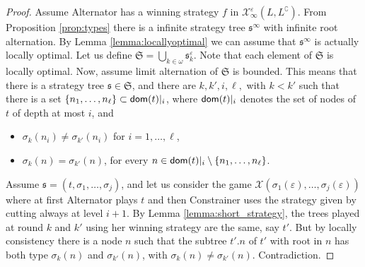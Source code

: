 \begin{proof}
Assume Alternator has a winning strategy $f$ in  $\mathcal{X}^\varepsilon_\infty(L, L^\complement)$. From Proposition \ref{prop:types} there is a infinite strategy tree $\mathfrak{s}^\infty$ with infinite root alternation. 
 By Lemma \ref{lemma:locallyoptimal} we can assume that $\mathfrak{s}^\infty$ is actually locally optimal. Let us define $\mathfrak{S}=\bigcup_{k \in \omega} \mathfrak{s}^\varepsilon_k$. Note that each element of $\mathfrak{S}$ is locally optimal.
Now, assume limit alternation of $\mathfrak{S}$ is bounded.
This means that there is a strategy tree $\mathfrak{s} \in \mathfrak{S}$, and there are $k, k', i, \ell, $ with $k < k'$ such that
 there is a set $\{n_1, \dots, n_\ell\} \subset \mathsf{dom}(t)|_i$, where $\mathsf{dom}(t)|_i$ denotes the set of nodes of $t$ of depth at most $i$, and
\begin{itemize}
\item $\sigma_k(n_i)\neq \sigma_{k'}(n_i)$ for $i=1, \dots, \ell$,
\item $\sigma_k(n)= \sigma_{k'}(n)$, for every $n \in \mathsf{dom}(t)|_i \setminus \{n_1, \dots, n_\ell\}$.
\end{itemize}
Assume $\mathfrak{s}=(t, \sigma_1, \dots, \sigma_j)$, and let us consider the game $\mathcal{X}( \sigma_1(\varepsilon), \dots, \sigma_j(\varepsilon))$ where at first Alternator plays $t$ and then Constrainer uses the strategy given by cutting always at level $i+1$. By Lemma \ref{lemma:short_strategy}, the trees played at round $k$ and $k'$ using her winning strategy are the same, say $t'$. But by locally consistency there is a node $n$ such that the subtree $t'.n$ of $t'$ with root in $n$ has both type $\sigma_k(n)$ and $\sigma_{k'}(n)$, with $\sigma_k(n) \neq \sigma_{k'}(n)$. Contradiction.
  \end{proof}
